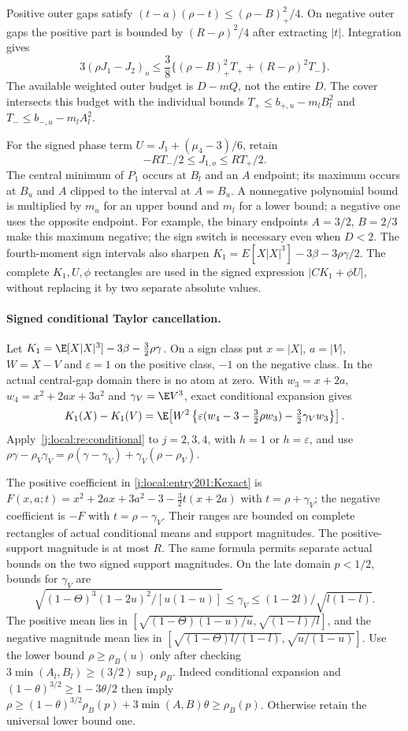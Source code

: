 Positive outer gaps satisfy
$(t-a)(\rho-t)\le(\rho-B)_+^2/4$. On negative outer gaps the positive
part is bounded by $(R-\rho)^2/4$ after extracting $|t|$.
Integration gives
\[
 3(\rho J_1-J_2)_o
 \le\frac38\{(\rho-B)_+^2T_++(R-\rho)^2T_-\}.
\]
The available weighted outer budget is $D-mQ$, not the entire $D$.
The cover intersects this budget with the individual bounds
$T_+\le b_{+,u}-m_lB_l^2$ and $T_-\le b_{-,u}-m_lA_l^2$.

For the signed phase term $U=J_1+(\mu_4-3)/6$, retain
\[
 -RT_-/2\le J_{1,o}\le RT_+/2.
\]
The central minimum of $P_1$ occurs at $B_l$ and an $A$ endpoint;
its maximum occurs at $B_u$ and $A$ clipped to the interval at $A=B_u$.
A nonnegative polynomial bound is multiplied by $m_u$ for an upper
bound and $m_l$ for a lower bound; a negative one uses the opposite
endpoint. For example, the binary endpoints $A=3/2$, $B=2/3$ make this
maximum negative; the sign switch is necessary even when $D<2$.
The fourth-moment sign intervals also sharpen
$K_1=E[X|X|^3]-3\beta-3\rho\gamma/2$.
The complete $K_1,U,\phi$ rectangles are used in the signed expression
$|CK_1+\phi U|$, without replacing it by two separate absolute values.



\paragraph{Signed conditional Taylor cancellation.}

Let $K_1=\E[X|X|^3]-3\beta-\tfrac32\rho\gamma$.
On a sign class put $x=|X|$, $a=|V|$, $W=X-V$ and
$\varepsilon=1$ on the positive class, $-1$ on the negative class.
In the actual central-gap domain there is no atom at zero.
With $w_3=x+2a$, $w_4=x^2+2ax+3a^2$ and
$\gamma_V=\E V^3$, exact conditional expansion gives
\begin{equation}\label{j:local:entry201:Kexact}
 K_1(X)-K_1(V)
 =\E\!\left[W^2
 \left\{\varepsilon(w_4-3-\tfrac32\rho w_3)
                   -\tfrac32\gamma_Vw_3\right\}\right].
\end{equation}
Apply~\eqref{j:local:re:conditional} to $j=2,3,4$, with $h=1$
or $h=\varepsilon$, and use
$\rho\gamma-\rho_V\gamma_V
=\rho(\gamma-\gamma_V)+\gamma_V(\rho-\rho_V)$.

The positive coefficient in \eqref{j:local:entry201:Kexact} is
$F(x,a;t)=x^2+2ax+3a^2-3-\tfrac32t(x+2a)$
with $t=\rho+\gamma_V$; the negative coefficient is $-F$
with $t=\rho-\gamma_V$. Their ranges are bounded on complete
rectangles of actual conditional means and support magnitudes.
The positive-support magnitude is at most $R$.
The same formula permits separate actual bounds on the two signed support magnitudes.
On the late domain $p<1/2$, bounds for $\gamma_V$ are
\[
 \sqrt{(1-\Theta)^3(1-2u)^2/[u(1-u)]}
 \le\gamma_V\le(1-2l)/\sqrt{l(1-l)}.
\]
The positive mean lies in
$[\sqrt{(1-\Theta)(1-u)/u},\sqrt{(1-l)/l}]$, and the negative
magnitude mean lies in
$[\sqrt{(1-\Theta)l/(1-l)},\sqrt{u/(1-u)}]$.
Use the lower bound $\rho\ge\rho_B(u)$ only after checking
$3\min(A_l,B_l)\ge(3/2)\sup_I\rho_B$. Indeed conditional expansion
and $(1-\theta)^{3/2}\ge1-3\theta/2$ then imply
$\rho\ge(1-\theta)^{3/2}\rho_B(p)+3\min(A,B)\theta\ge\rho_B(p)$.
Otherwise retain the universal lower bound one.

